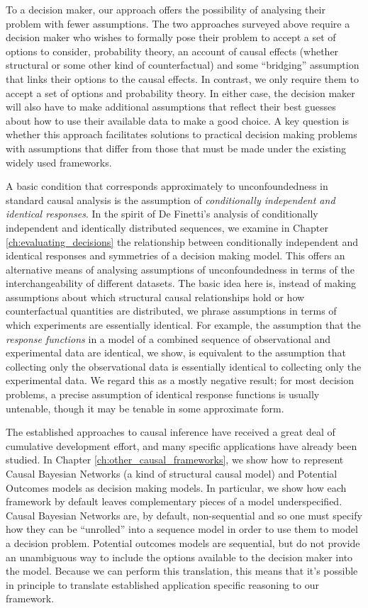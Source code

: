 To a decision maker, our approach offers the possibility of analysing their problem with fewer assumptions. The two approaches surveyed above require a decision maker who wishes to formally pose their problem to accept a set of options to consider, probability theory, an account of causal effects (whether structural or some other kind of counterfactual) and some ``bridging'' assumption that links their options to the causal effects. In contrast, we only require them to accept a set of options and probability theory. In either case, the decision maker will also have to make additional assumptions that reflect their best guesses about how to use their available data to make a good choice. A key question is whether this approach facilitates solutions to practical decision making problems with assumptions that differ from those that must be made under the existing widely used frameworks.

A basic condition that corresponds approximately to unconfoundedness in standard causal analysis is the assumption of \emph{conditionally independent and identical responses}. In the spirit of De Finetti's analysis of conditionally independent and identically distributed sequences, we examine in Chapter \ref{ch:evaluating_decisions} the relationship between conditionally independent and identical responses and symmetries of a decision making model. This offers an alternative means of analysing assumptions of unconfoundedness in terms of the interchangeability of different datasets. The basic idea here is, instead of making assumptions about which structural causal relationships hold or how counterfactual quantities are distributed, we phrase assumptions in terms of which experiments are essentially identical. For example, the assumption that the \emph{response functions} in a model of a combined sequence of observational and experimental data are identical, we show, is equivalent to the assumption that collecting only the observational data is essentially identical to collecting only the experimental data. We regard this as a mostly negative result; for most decision problems, a precise assumption of identical response functions is usually untenable, though it may be tenable in some approximate form.

The established approaches to causal inference have received a great deal of cumulative development effort, and many specific applications have already been studied. In Chapter \ref{ch:other_causal_frameworks}, we show how to represent Causal Bayesian Networks (a kind of structural causal model) and Potential Outcomes models as decision making models. In particular, we show how each framework by default leaves complementary pieces of a model underspecified. Causal Bayesian Networks are, by default, non-sequential and so one must specify how they can be ``unrolled'' into a sequence model in order to use them to model a decision problem. Potential outcomes models are sequential, but do not provide an unambiguous way to include the options available to the decision maker into the model. Because we can perform this translation, this means that it's possible in principle to translate established application specific reasoning to our framework.

